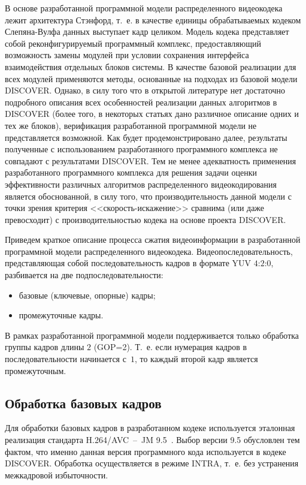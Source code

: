 В основе разработанной программной модели распределенного видеокодека лежит архитектура Стэнфорд, т.~е. в качестве единицы обрабатываемых кодеком Слепяна-Вулфа данных выступает кадр целиком. Модель кодека представляет собой реконфигурируемый программный комплекс, предоставляющий возможность замены модулей при условии сохранения интерфейса взаимодействия отдельных блоков системы. В качестве базовой реализации для всех модулей применяются методы, основанные на подходах из базовой модели DISCOVER. Однако, в силу того что в открытой литературе нет достаточно подробного описания всех особенностей реализации данных алгоритмов в DISCOVER (более того, в некоторых статьях дано различное описание одних и тех же блоков), верификация разработанной программной модели не представляется возможной. Как будет продемонстрировано далее, результаты полученные с использованием разработанного программного комплекса не совпадают с результатами DISCOVER. Тем не менее адекватность применения разработанного программного комплекса для решения задачи оценки эффективности различных алгоритмов распределенного видеокодирования является обоснованной, в силу того, что производительность данной модели с точки зрения критерия <<скорость-искажение>> сравнима (или даже превосходит) с производительностью кодека на основе проекта DISCOVER.

Приведем краткое описание процесса сжатия видеоинформации в разработанной программной модели распределенного видеокодека. Видеопоследовательность, представляющая собой последовательность кадров в формате YUV $4$:$2$:$0$, разбивается на две подпоследовательности:
\begin{itemize}
  \item базовые (ключевые, опорные) кадры;
  \item промежуточные кадры.
\end{itemize}

В рамках разработанной программной модели поддерживается только обработка группы кадров длины $2$ (GOP=2). Т.~е. если нумерация кадров в последовательности начинается с~$1$, то каждый второй кадр является промежуточным.

\subsection{Обработка базовых кадров}
\label{chap:ExpResults:CodecModel:KeyFrames}

Для обработки базовых кадров в разработанном кодеке используется эталонная реализация стандарта H.264/AVC~--~JM 9.5~\cite{h264jm}. Выбор версии 9.5 обусловлен тем фактом, что именно данная версия программного кода используется в кодеке DISCOVER. Обработка осуществляется в режиме INTRA, т.~е. без устранения межкадровой избыточности. 

